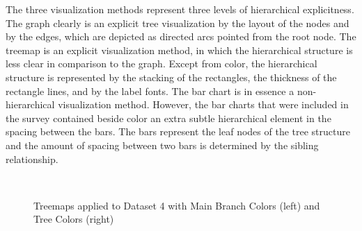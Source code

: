 \documentclass[journal]{vgtc}                %
\begin{document}
The three visualization methods represent three levels of hierarchical explicitness. The graph clearly is an explicit tree visualization by the layout of the nodes and by the edges, which are depicted as directed arcs pointed from the root node. The treemap is an explicit visualization method, in which the hierarchical structure is less clear in comparison to the graph. Except from color, the hierarchical structure is represented by the stacking of the rectangles, the thickness of the rectangle lines, and by the label fonts. The bar chart is in essence a non-hierarchical visualization method. However, the bar charts that were included in the survey contained beside color an extra subtle hierarchical element in the spacing between the bars. The bars represent the leaf nodes of the tree structure and the amount of spacing between two bars is determined by the sibling relationship.

\begin{figure}[tb]
  \centering
  \mbox{
  }
  \caption{Treemaps applied to Dataset 4 with Main Branch Colors (left) and Tree Colors (right)}\label{fig:treemapSvy}

\end{figure}
\end{document}
